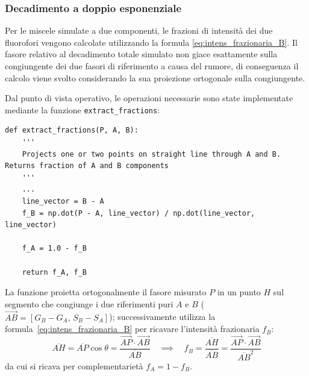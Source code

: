 \subsubsection{Decadimento a doppio esponenziale}
\label{sec:verifica_del_rapporto_di_concentrazione}

Per le miscele simulate a due componenti, le frazioni di intensità dei due fluorofori vengono calcolate utilizzando la formula \ref{eq:intens_frazionaria_B}. Il fasore relativo al decadimento totale simulato non giace esattamente sulla congiungente dei due fasori di riferimento a causa del rumore, di conseguenza il calcolo viene svolto considerando la sua proiezione ortogonale sulla congiungente.

Dal punto di vista operativo, le operazioni necessarie sono state implementate mediante la funzione \texttt{extract\_fractions}:

\begin{verbatim}
def extract_fractions(P, A, B):
    '''
    Projects one or two points on straight line through A and B. Returns fraction of A and B components
    '''
    ...
    line_vector = B - A
    f_B = np.dot(P - A, line_vector) / np.dot(line_vector, line_vector)
    
    f_A = 1.0 - f_B
    
    return f_A, f_B
\end{verbatim}
La funzione proietta ortogonalmente il fasore misurato $P$ in un punto $H$ sul segmento che congiunge i due riferimenti puri $A$ e $B$ ($\vec{AB} = [G_B - G_A,\, S_B - S_A]$); successivamente utilizza la formula~\ref{eq:intens_frazionaria_B} per ricavare l'intensità frazionaria $f_B$:
\begin{equation*}
    \overline{AH} = \overline{AP}\cos\theta = \frac{\vec{AP}\cdot\vec{AB}}{\overline{AB}} \quad \implies \quad f_B = \frac{\overline{AH}}{\overline{AB}} = \frac{\vec{AP}\cdot\vec{AB}}{\overline{AB}^2}
\end{equation*}
da cui si ricava per complementarietà $f_A = 1 - f_B$.


